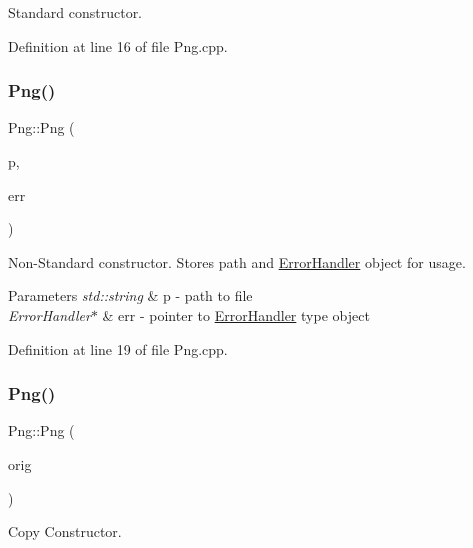 Standard constructor. 



Definition at line 16 of file Png.\+cpp.

\mbox{\label{classPng_a11aa0090e4a364ac741d4eae05261137}} 
\subsubsection{\texorpdfstring{Png()}{Png()}\hspace{0.1cm}{\footnotesize\ttfamily [2/3]}}
{\footnotesize\ttfamily Png\+::\+Png (\begin{DoxyParamCaption}\item[{std\+::string}]{p,  }\item[{\mbox{\hyperlink{classErrorHandler}{Error\+Handler}} $\ast$}]{err }\end{DoxyParamCaption})}



Non-\/\+Standard constructor. Stores path and \mbox{\hyperlink{classErrorHandler}{Error\+Handler}} object for usage. 


\begin{DoxyParams}{Parameters}
{\em std\+::string} & p -\/ path to file \\
\hline
{\em Error\+Handler$\ast$} & err -\/ pointer to \mbox{\hyperlink{classErrorHandler}{Error\+Handler}} type object \\
\hline
\end{DoxyParams}


Definition at line 19 of file Png.\+cpp.

\mbox{\label{classPng_ac23e669b23506fb9d0ccfc1f51f1bcf2}} 
\subsubsection{\texorpdfstring{Png()}{Png()}\hspace{0.1cm}{\footnotesize\ttfamily [3/3]}}
{\footnotesize\ttfamily Png\+::\+Png (\begin{DoxyParamCaption}\item[{const \mbox{\hyperlink{classPng}{Png}} \&}]{orig }\end{DoxyParamCaption})}



Copy Constructor. 


